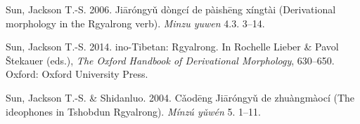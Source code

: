 \begin{thebibliography}{17}
Sun, Jackson T.-S. 2006.
\newblock {} {J}iāróngyǔ dòngcí de
  pàishēng xíngtài ({D}erivational morphology in the {R}gyalrong verb).
\newblock \emph{Minzu yuwen } 4.3. 3--14.

Sun, Jackson T.-S. 2014.
ino-{T}ibetan: {R}gyalrong.
\newblock In Rochelle Lieber \& Pavol Štekauer (eds.), \emph{{T}he {O}xford
  {H}andbook of {D}erivational {M}orphology}, 630--650. Oxford: Oxford
  University Press.

Sun, Jackson T.-S. \& Shidanluo. 2004.
\newblock {} {C}ǎodēng {J}iāróngyǔ de
  zhuàngmàocí ({T}he ideophones in {T}shobdun {R}gyalrong).
\newblock \emph{Mínzú y\v{u}wén } 5. 1--11.

\end{thebibliography}

\cleardoublepage
{}
\setmainfont[Mapping=tex-text,Numbers=OldStyle,Ligatures=Common]{Charis SIL} 